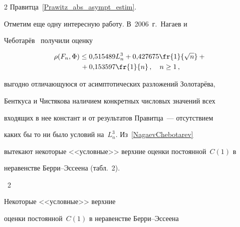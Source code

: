 \begin{multicols}{2}
Правитца~\eqref{Prawitz_abs_asympt_estim}.





Отметим еще одну интересную работу. В~2006~г.\ Нагаев и


Чеботарёв~\cite{NagaevChebotarev2006} получили оценку


\begin{multline}


\rho(F_n,\Phi)\le 0{,}515489 L_n^3+ 0{,}427675\fr{1}{\sqrt n}+{}\\


{}+


0{,}153597\fr{1}{n}\,,\quad n\ge1\,, \label{NagaevChebotarev}


\end{multline}


выгодно отличающуюся от асимптотических разложений Золотарёва,


Бенткуса и Чистякова наличием конкретных числовых значений всех


входящих в нее констант и от результатов Правитца~--- отсутствием


каких бы то ни было условий на~$L_n^3$. Из~\eqref{NagaevChebotarev}


вытекают некоторые <<условные>> верхние оценки постоянной~$C(1)$ в


неравенстве Берри--Эс\-се\-ена (табл.~2).





\vspace*{12pt}


\noindent %


\begin{center}


\parbox{62mm}{{\tablename~2}\ \ \small{Некоторые <<условные>> верхние


оценки постоянной~$C(1)$ в неравенстве Берри--Эссеена}}


\end{center}


\vspace*{-6pt}





{\small


\begin{center}


\tabcolsep=7pt


\begin{tabular}{|l|c|c|}



\end{tabular}
\end{center}}
\end{multicols}
